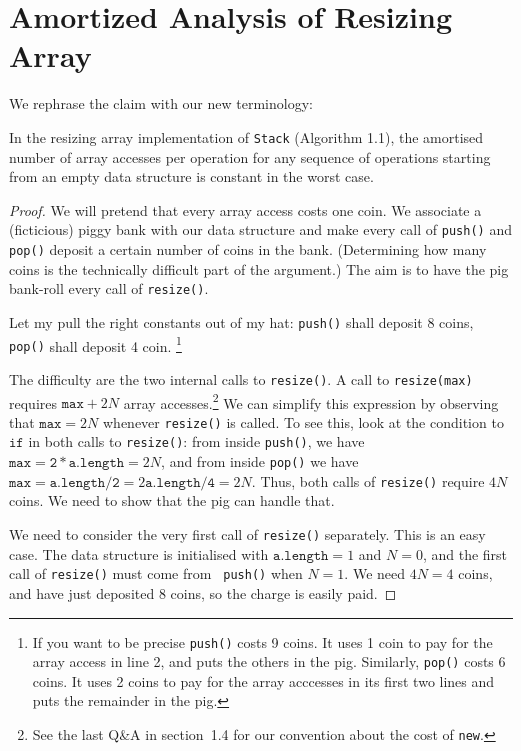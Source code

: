 \documentclass{tstextbook}
\begin{document}
\section{Amortized Analysis of Resizing Array}

We rephrase the claim with our new terminology:

\begin{theorem}
  In the resizing array implementation of {\tt Stack} (Algorithm 1.1),
  the amortised number of array accesses per operation for any
  sequence of operations starting from an empty data structure is
  constant in the worst case.
\end{theorem}
\begin{proof}
We will pretend that every array access costs one coin.  
We associate a (ficticious) piggy bank with our data structure and
make every call of {\tt push()} and {\tt pop()} deposit a certain
number of coins in the bank.  
(Determining how many coins is the technically difficult part of the
argument.) 
The aim is to have the pig bank-roll every call of {\tt resize()}.

Let my pull the right constants out of my hat: {\tt push()} shall
deposit 8 coins, {\tt pop()} shall deposit 4 coin.%
\footnote{If you want to be precise {\tt push()} costs 9 coins. %
  It uses 1 coin to pay for the array access in line 2, and puts the
  others in the pig. %
  Similarly, {\tt pop()} costs 6 coins. %
  It uses 2 coins to pay for the array acccesses in its first two
  lines and puts the remainder in the pig.}

The difficulty are the two internal calls to {\tt resize()}.  
A call to {\tt resize(max)} requires $\mathtt{max}+ 2N$ array
accesses.\footnote{See the last Q\&A in section~1.4 for our convention
  about the cost of {\tt new}.}  
We can simplify this expression by observing that $\mathtt{max}=2N$
whenever {\tt resize()} is called.
To see this, look at the condition to $\mathtt{if}$ in both calls to
\texttt{resize()}: from inside \texttt{push()}, we have $\mathtt{max}=
\mathtt{2*a.length} = 2N$, and from inside \texttt{pop()} we have
$\mathtt{max}= \mathtt{a.length/2}= 2 \mathtt{a.length/4} = 2N$.
Thus, both calls of {\tt resize()} require $4N$ coins.  
We need to show that the pig can handle that.

We need to consider the very first call of {\tt resize()} separately.
This is an easy case.  
The data structure is initialised with $\mathtt{a.length}=1$ and
$N=0$, and the first call of {\tt resize()} must come from {\tt
  push()} when $N=1$.  
We need $4N=4$ coins, and have just deposited $8$ coins, so the charge
is easily paid.


\end{proof}
\end{document}
